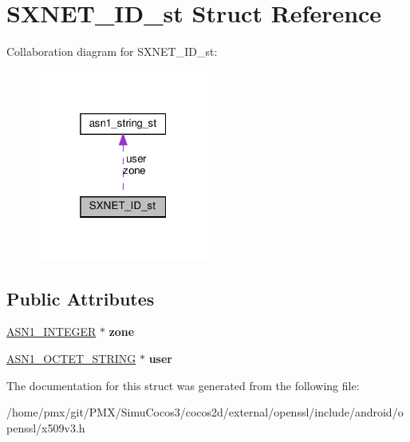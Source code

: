 \hypertarget{structSXNET__ID__st}{}\section{S\+X\+N\+E\+T\+\_\+\+I\+D\+\_\+st Struct Reference}
\label{structSXNET__ID__st}


Collaboration diagram for S\+X\+N\+E\+T\+\_\+\+I\+D\+\_\+st\+:
\nopagebreak
\begin{figure}[H]
\begin{center}
\leavevmode
\includegraphics[width=160pt]{structSXNET__ID__st__coll__graph}
\end{center}
\end{figure}
\subsection*{Public Attributes}
\begin{DoxyCompactItemize}
\item 
\mbox{\label{structSXNET__ID__st_a1fe626a26bfaab9431185ab88664d5c3}} 
\hyperlink{structasn1__string__st}{A\+S\+N1\+\_\+\+I\+N\+T\+E\+G\+ER} $\ast$ {\bfseries zone}
\item 
\mbox{\label{structSXNET__ID__st_a9cc4dc28f29ab402c19193cede33b432}} 
\hyperlink{structasn1__string__st}{A\+S\+N1\+\_\+\+O\+C\+T\+E\+T\+\_\+\+S\+T\+R\+I\+NG} $\ast$ {\bfseries user}
\end{DoxyCompactItemize}


The documentation for this struct was generated from the following file\+:\begin{DoxyCompactItemize}
\item 
/home/pmx/git/\+P\+M\+X/\+Simu\+Cocos3/cocos2d/external/openssl/include/android/openssl/x509v3.\+h\end{DoxyCompactItemize}

